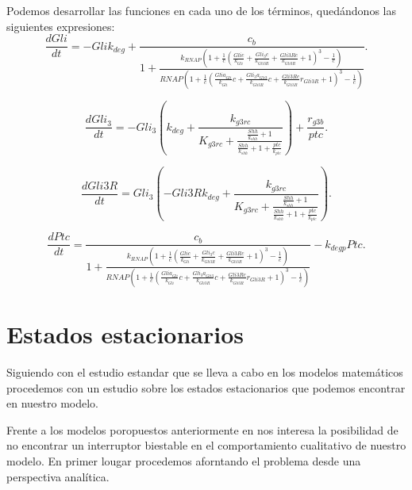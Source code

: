 Podemos desarrollar las funciones en cada uno de los términos, quedándonos las siguientes expresiones:
\begin{equation}
\frac{dGli}{dt}=- Gli k_{deg} + \frac{c_{b}}{1 + \frac{k_{RNAP} \left(1 + \frac{1}{c} \left(\frac{Gli c}{k_{Gli}} + \frac{Gli_{3} c}{k_{Gli3R}} + \frac{Gli3R c}{k_{Gli3R}} + 1\right)^{3} - \frac{1}{c}\right)}{RNAP \left(1 + \frac{1}{c} \left(\frac{Gli a_{Gli}}{k_{Gli}} c + \frac{Gli_{3} a_{Gli3}}{k_{Gli3R}} c + \frac{Gli3R c}{k_{Gli3R}} r_{Gli3R} + 1\right)^{3} - \frac{1}{c}\right)}}.
\end{equation}


\begin{equation}
\frac{dGli_3}{dt}=- Gli_{3} \left(k_{deg} + \frac{k_{g3rc}}{K_{g3rc} + \frac{\frac{Shh}{k_{shh}} + 1}{\frac{Shh}{k_{shh}} + 1 + \frac{ptc}{k_{ptc}}}}\right) + \frac{r_{g3b}}{ptc}.
\end{equation}

\begin{equation}
\frac{dGli3R}{dt}=Gli_{3} \left(- Gli3R k_{deg} + \frac{k_{g3rc}}{K_{g3rc} + \frac{\frac{Shh}{k_{shh}} + 1}{\frac{Shh}{k_{shh}} + 1 + \frac{ptc}{k_{ptc}}}}\right).
\end{equation}

\begin{equation}
\frac{dPtc}{dt}=\frac{c_{b}}{1 + \frac{k_{RNAP} \left(1 + \frac{1}{c} \left(\frac{Gli c}{k_{Gli}} + \frac{Gli_{3} c}{k_{Gli3R}} + \frac{Gli3R c}{k_{Gli3R}} + 1\right)^{3} - \frac{1}{c}\right)}{RNAP \left(1 + \frac{1}{c} \left(\frac{Gli a_{Gli}}{k_{Gli}} c + \frac{Gli_{3} a_{Gli3}}{k_{Gli3R}} c + \frac{Gli3R c}{k_{Gli3R}} r_{Gli3R} + 1\right)^{3} - \frac{1}{c}\right)}} - k_{deg p} Ptc.
\end{equation}




\section{Estados estacionarios}
Siguiendo con el estudio estandar que se lleva a cabo en los modelos matemáticos procedemos con un estudio sobre los estados estacionarios que podemos encontrar en nuestro modelo.

Frente a los modelos poropuestos anteriormente en \cite{saha,schaffer} nos interesa la posibilidad de no encontrar un interruptor biestable en el comportamiento cualitativo de nuestro modelo. En primer lougar procedemos aforntando el problema desde una perspectiva analítica. 

